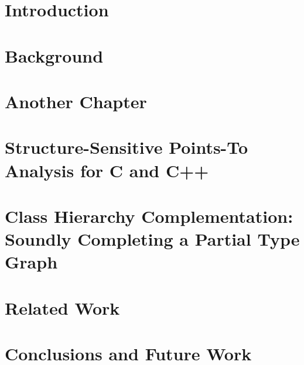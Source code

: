 \documentclass[inscr,ack,preface]{diphdthesis}
\begin{document}

\frontmatter



\mainmatter

\chapter{Introduction}


\chapter{Background}

\chapter{Another Chapter}

\chapter[Structure-Sensitive Points-To Analysis for C and C++]{%
  Structure-Sensitive Points-To Analysis \NoCaseChange{\\} for C and C++}


\chapter[Class Hierarchy Complementation for Java]{%
  Class Hierarchy Complementation: \NoCaseChange{\\}
  Soundly Completing a Partial Type Graph}


\chapter{Related Work}


\chapter{Conclusions and Future Work}
\end{document}
